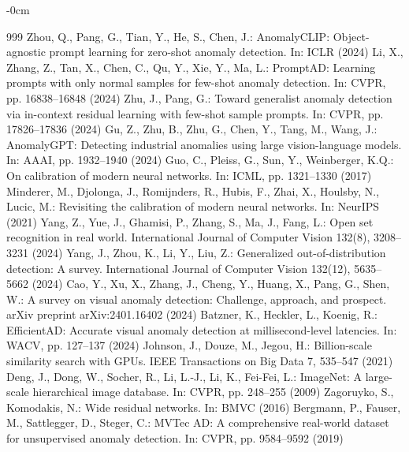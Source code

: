 \documentclass[remotesensing,article,submit,pdftex,moreauthors]{Definitions/mdpi}
\begin{document}
\begin{adjustwidth}{-\extralength}{0cm}
\begin{thebibliography}{999}
Zhou, Q., Pang, G., Tian, Y., He, S., Chen, J.: AnomalyCLIP: Object-agnostic prompt learning for zero-shot anomaly detection. In: ICLR (2024)
Li, X., Zhang, Z., Tan, X., Chen, C., Qu, Y., Xie, Y., Ma, L.: PromptAD: Learning prompts with only normal samples for few-shot anomaly detection. In: CVPR, pp. 16838--16848 (2024)
Zhu, J., Pang, G.: Toward generalist anomaly detection via in-context residual learning with few-shot sample prompts. In: CVPR, pp. 17826--17836 (2024)
Gu, Z., Zhu, B., Zhu, G., Chen, Y., Tang, M., Wang, J.: AnomalyGPT: Detecting industrial anomalies using large vision-language models. In: AAAI, pp. 1932--1940 (2024)
Guo, C., Pleiss, G., Sun, Y., Weinberger, K.Q.: On calibration of modern neural networks. In: ICML, pp. 1321--1330 (2017)
Minderer, M., Djolonga, J., Romijnders, R., Hubis, F., Zhai, X., Houlsby, N., Lucic, M.: Revisiting the calibration of modern neural networks. In: NeurIPS (2021)
Yang, Z., Yue, J., Ghamisi, P., Zhang, S., Ma, J., Fang, L.: Open set recognition in real world. International Journal of Computer Vision 132(8), 3208--3231 (2024)
Yang, J., Zhou, K., Li, Y., Liu, Z.: Generalized out-of-distribution detection: A survey. International Journal of Computer Vision 132(12), 5635--5662 (2024)
Cao, Y., Xu, X., Zhang, J., Cheng, Y., Huang, X., Pang, G., Shen, W.: A survey on visual anomaly detection: Challenge, approach, and prospect. arXiv preprint arXiv:2401.16402 (2024)
Batzner, K., Heckler, L., Koenig, R.: EfficientAD: Accurate visual anomaly detection at millisecond-level latencies. In: WACV, pp. 127--137 (2024)
Johnson, J., Douze, M., Jegou, H.: Billion-scale similarity search with GPUs. IEEE Transactions on Big Data 7, 535--547 (2021)
Deng, J., Dong, W., Socher, R., Li, L.-J., Li, K., Fei-Fei, L.: ImageNet: A large-scale hierarchical image database. In: CVPR, pp. 248--255 (2009)
Zagoruyko, S., Komodakis, N.: Wide residual networks. In: BMVC (2016)
Bergmann, P., Fauser, M., Sattlegger, D., Steger, C.: MVTec AD: A comprehensive real-world dataset for unsupervised anomaly detection. In: CVPR, pp. 9584--9592 (2019)
\end{thebibliography}
\end{adjustwidth}
\end{document}
